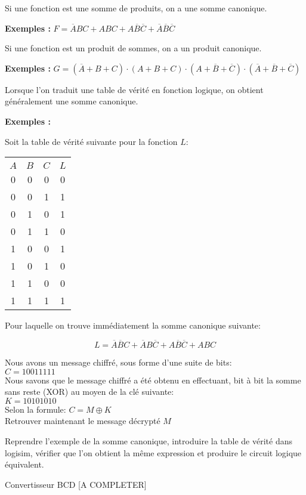 \documentclass[a4paper,11pt]{book}
\theoremstyle{definition}
\theoremstyle{definition}
\begin{document}
Si une fonction est une somme de produits, on a une somme canonique.

\textbf{Exemples :} $F = \overline{A}BC + ABC + A\overline{B}\overline{C} + \overline{A}\overline{B}\overline{C}$

Si une fonction est un produit de sommes, on a un produit canonique.

\textbf{Exemples :} $G = (\overline{A} + B+ C)\cdot(A + B + C)\cdot(A + \overline{B}+ \overline{C})\cdot(\overline{A} + \overline{B} + \overline{C})$

Lorsque l'on traduit une table de vérité en fonction logique, on obtient généralement une somme canonique.

\textbf{Exemples :}

Soit la table de vérité suivante pour la fonction $L$:

  \begin{tabular}{|ccc|c|}
    \hline
         & & & \\
        $A$ & $B$ & $C$ & $L$ \\
    \hline 
        0 & 0 & 0 & 0 \\
        0 & 0 & 1 & 1 \\
        0 & 1 & 0 & 1 \\
        0 & 1 & 1 & 0 \\
        1 & 0 & 0 & 1 \\
        1 & 0 & 1 & 0 \\
        1 & 1 & 0 & 0 \\
        1 & 1 & 1 & 1 \\
    \hline
  \end{tabular}

Pour laquelle on trouve immédiatement la somme canonique suivante:

\[L = \overline{A}\overline{B}C + \overline{A}B\overline{C}+A\overline{B}\overline{C}+ABC \]


\begin{exercise}
Nous avons un message chiffré, sous forme d'une suite de bits:
\\
$C = 10011111$
\\
Nous savons que le message chiffré a été obtenu en effectuant, bit à bit la somme sans reste (XOR) au moyen de la clé suivante:
\\
$K = 10101010$
\\
Selon la formule: $C = M \oplus K$
\\
Retrouver maintenant le message décrypté $M$
\end{exercise}

\begin{exercise}
Reprendre l'exemple de la somme canonique, introduire la table de vérité dans logisim, vérifier que l'on obtient la même expression et produire le circuit logique équivalent.
\end{exercise}

\begin{exercise}
Convertisseur BCD [A COMPLETER]
\end{exercise}

%
\end{document}
